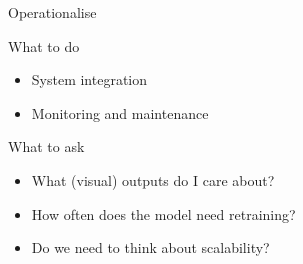 \begin{frame}[t]{Operationalise}
    \begin{block}{What to do}
        \begin{itemize}
            \item System integration
            \item Monitoring and maintenance
        \end{itemize}
    \end{block}
    \vfill
    \begin{block}{What to ask}
        \begin{itemize}
            \item What (visual) outputs do I care about?
            \item How often does the model need retraining?
            \item Do we need to think about scalability?
        \end{itemize}
    \end{block}
\end{frame}



